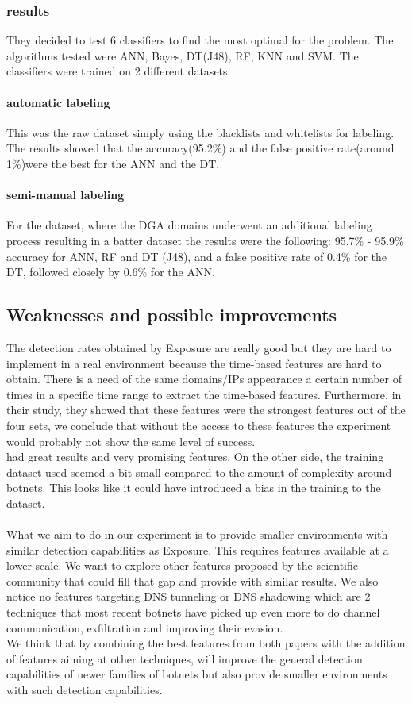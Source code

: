 \subsubsection{results}
They decided to test 6 classifiers to find the most optimal for the problem. The algorithms tested were ANN, Bayes, DT(J48), RF, KNN and SVM. The classifiers were trained on 2 different datasets. 
\paragraph{automatic labeling}
This was the raw dataset simply using the blacklists and whitelists for labeling. The results showed that the accuracy(95.2\%) and the false positive rate(around 1\%)were the best for the ANN and the DT.
\paragraph{semi-manual labeling}
For the dataset, where the DGA domains underwent an additional labeling process resulting in a batter dataset the results were the following: 95.7\% - 95.9\% accuracy for ANN, RF and DT (J48), and a false positive rate of 0.4\% for the DT, followed closely by 0.6\% for the ANN.


\subsection{Weaknesses and possible improvements}
The detection rates obtained by Exposure are really good but they are hard to implement in a real environment because the time-based features are hard to obtain. There is a need of the same domains/IPs appearance a certain number of times in a specific time range to extract the time-based features. Furthermore, in their study, they showed that these features were the strongest features out of the four sets, we conclude that without the access to these features the experiment would probably not show the same level of success. \\
\cite{localbotnet} had great results and very promising features. On the other side, the training dataset used seemed a bit small compared to the amount of complexity around botnets. This looks like it could have introduced a bias in the training to the dataset.\\
\\
What we aim to do in our experiment is to provide smaller environments with similar detection capabilities as Exposure. This requires features available at a lower scale. We want to explore other features proposed by the scientific community that could fill that gap and provide with similar results.
We also notice no features targeting DNS tunneling or DNS shadowing which are 2 techniques that most recent botnets have picked up even more to do channel communication, exfiltration and improving their evasion.\\
We think that by combining the best features from both papers with the addition of features aiming at other techniques, will improve the general detection capabilities of newer families of botnets but also provide smaller environments with such detection capabilities.

